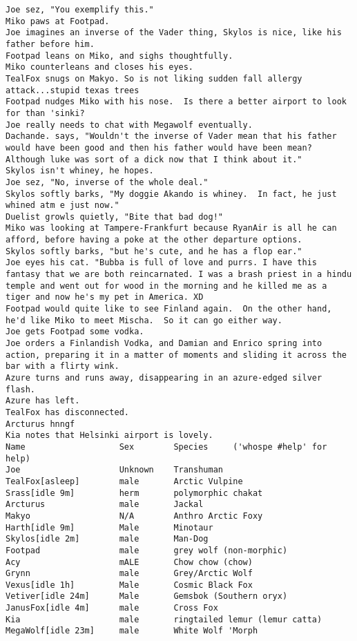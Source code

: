 \begin{verbatim}
Joe sez, "You exemplify this."
Miko paws at Footpad.
Joe imagines an inverse of the Vader thing, Skylos is nice, like his father before him.
Footpad leans on Miko, and sighs thoughtfully.
Miko counterleans and closes his eyes.
TealFox snugs on Makyo. So is not liking sudden fall allergy attack...stupid texas trees
Footpad nudges Miko with his nose.  Is there a better airport to look for than 'sinki?
Joe really needs to chat with Megawolf eventually.
Dachande. says, "Wouldn't the inverse of Vader mean that his father would have been good and then his father would have been mean? Although luke was sort of a dick now that I think about it."
Skylos isn't whiney, he hopes.
Joe sez, "No, inverse of the whole deal."
Skylos softly barks, "My doggie Akando is whiney.  In fact, he just whined atm e just now."
Duelist growls quietly, "Bite that bad dog!"
Miko was looking at Tampere-Frankfurt because RyanAir is all he can afford, before having a poke at the other departure options.
Skylos softly barks, "but he's cute, and he has a flop ear."
Joe eyes his cat. "Bubba is full of love and purrs. I have this fantasy that we are both reincarnated. I was a brash priest in a hindu temple and went out for wood in the morning and he killed me as a tiger and now he's my pet in America. XD
Footpad would quite like to see Finland again.  On the other hand, he'd like Miko to meet Mischa.  So it can go either way.
Joe gets Footpad some vodka.
Joe orders a Finlandish Vodka, and Damian and Enrico spring into action, preparing it in a matter of moments and sliding it across the bar with a flirty wink.
Azure turns and runs away, disappearing in an azure-edged silver flash.
Azure has left.
TealFox has disconnected.
Arcturus hnngf
Kia notes that Helsinki airport is lovely.
Name                   Sex        Species     ('whospe #help' for help)
Joe                    Unknown    Transhuman
TealFox[asleep]        male       Arctic Vulpine
Srass[idle 9m]         herm       polymorphic chakat
Arcturus               male       Jackal
Makyo                  N/A        Anthro Arctic Foxy
Harth[idle 9m]         Male       Minotaur
Skylos[idle 2m]        male       Man-Dog
Footpad                male       grey wolf (non-morphic)
Acy                    mALE       Chow chow (chow)
Grynn                  male       Grey/Arctic Wolf
Vexus[idle 1h]         Male       Cosmic Black Fox
Vetiver[idle 24m]      Male       Gemsbok (Southern oryx)
JanusFox[idle 4m]      male       Cross Fox
Kia                    male       ringtailed lemur (lemur catta)
MegaWolf[idle 23m]     male       White Wolf 'Morph

\end{verbatim}
